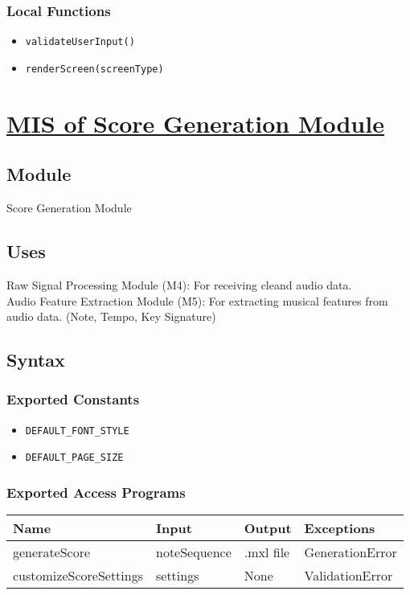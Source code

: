 \documentclass[12pt, titlepage]{article}
\begin{document}
\subsubsection{Local Functions}  
\begin{itemize}  
    \item \texttt{validateUserInput()}  
    \item \texttt{renderScreen(screenType)}  
\end{itemize}  

\section{\hyperref[mSG]{MIS of Score Generation Module}} \label{M3}  

\subsection{Module}  
Score Generation Module  

\subsection{Uses}  
Raw Signal Processing Module (M4): For receiving cleand audio data. \\
Audio Feature Extraction Module (M5): For extracting musical features from audio data. (Note, Tempo, Key Signature) \\
\subsection{Syntax}  

\subsubsection{Exported Constants}  
\begin{itemize}
    \item \texttt{DEFAULT\_FONT\_STYLE}  
    \item \texttt{DEFAULT\_PAGE\_SIZE}  
\end{itemize}  

\subsubsection{Exported Access Programs}  
\begin{center}  
\begin{tabular}{|p{5cm}|p{4cm}|p{2cm}|p{3.5cm}|}  
\hline  
\textbf{Name} & \textbf{Input} & \textbf{Output} & \textbf{Exceptions} \\  
\hline  
generateScore & noteSequence & .mxl file & GenerationError \\  
customizeScoreSettings & settings & None & ValidationError \\  
\hline  
\end{tabular}  
\end{center}  
\end{document}
